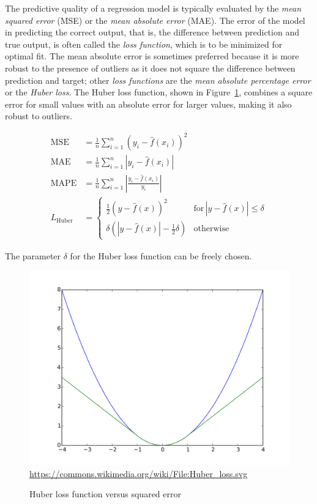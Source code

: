The predictive quality of a regression model is typically evaluated by the \emph{mean squared error} (MSE) or the \emph{mean absolute error} (MAE). The error of the model in predicting the correct output, that is, the difference between prediction and true output, is often called the \emph{loss function}, which is to be minimized for optimal fit. The mean absolute error is sometimes preferred because it is more robust to the presence of outliers as it does not square the difference between prediction and target; other \emph{loss functions} are the \emph{mean absolute percentage error} or the \emph{Huber loss}. The Huber loss function, shown in Figure~\ref{fig:huber}, combines a square error for small values with an absolute error for larger values, making it also robust to outliers. 

\begin{align*}
\operatorname{MSE} &= \frac{1}{n}\sum_{i=1}^n (y_i - \hat{f}(x_i))^2 \\
\operatorname{MAE} &= \frac{1}{n}\sum_{i=1}^n |y_i - \hat{f}(x_i)| \\
\operatorname{MAPE} &= \frac{1}{n}\sum_{i=1}^n | \frac{y_i - \hat{f}(x_i)}{y_i}| \\
L_{\text{Huber}} &= \begin{cases} \frac{1}{2}(y - \hat{f}(x))^2 & \text{for}\, |y-\hat{f}(x)| \leq \delta \\
\delta (|y - \hat{f}(x)| - \frac{1}{2}\delta) & \text{otherwise} \end{cases}
\end{align*}

\noindent The parameter $\delta$ for the Huber loss function can be freely chosen.

\begin{figure}
\centering
\includegraphics[width=.75\textwidth]{huber.png}
\scriptsize \url{https://commons.wikimedia.org/wiki/File:Huber_loss.svg}
\caption{Huber loss function versus squared error}
\label{fig:huber}
\end{figure}

